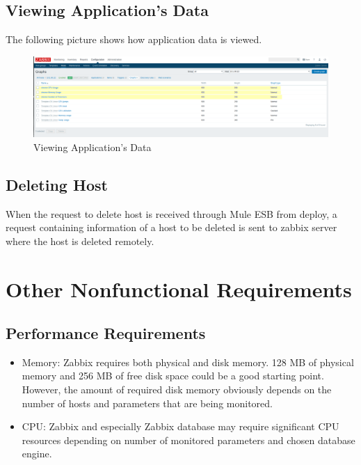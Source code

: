 \documentclass{article}
\begin{document}
\subsection{ Viewing Application’s Data}

The following picture shows how application data is viewed. 

\begin{figure}[ht]
\includegraphics[scale=0.3]{graphs_eklendi1}
\caption{Viewing Application's Data}
\end{figure}


\subsection{Deleting Host}

 When the request to delete host is received through Mule ESB from deploy, a request containing information of a host to be deleted is sent to zabbix server where the host is deleted remotely.





\section{Other Nonfunctional Requirements}

\subsection{Performance Requirements}
\begin{itemize}
\item[]Memory:
    Zabbix requires both physical and disk memory. 128 MB of physical memory and 256 MB of free disk space could be a good starting point. However, the amount of required disk memory obviously depends on the number of hosts and parameters that are being monitored.
\item[]CPU:
   Zabbix and especially Zabbix database may require significant CPU resources depending on number of monitored parameters and chosen database engine.
   
 \end{itemize}
\end{document}
